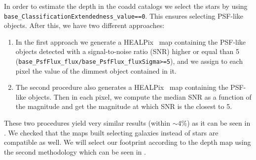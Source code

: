 \documentclass[\docopts]{\docclass}
\begin{document}
In order to estimate the depth in the coadd catalogs we select the stars by using \texttt{base\_ClassificationExtendedness\_value==0}. This ensures selecting
PSF-like objects. After this, we have two different approaches:

\begin{enumerate}
\item In the first approach we generate a HEALPix~\citep{2005ApJ...622..759G} map containing the PSF-like objects detected with a signal-to-noise ratio (SNR) higher or equal than 5 (\texttt{base\_PsfFlux\_flux/base\_PsfFlux\_fluxSigma>=5}), and we assign to each pixel the value of the
dimmest object contained in it.
\item The second procedure also generates a HEALPix~\citep{2005ApJ...622..759G} map containing the PSF-like objects. Then in each pixel, we compute the median SNR as a function of the magnitude and get the magnitude at which SNR is the closest to 5.
\end{enumerate}

These two procedures yield very similar results (within $\sim 4\%$) as it can be seen in . We checked that the maps built selecting galaxies instead of stars are compatible as well. We will select our footprint according to the depth map using the second methodology which can be seen in .
\end{document}
